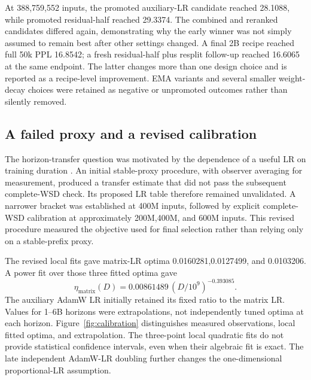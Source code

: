 At 388,759,552 inputs, the promoted auxiliary-LR candidate reached 28.1088, while promoted residual-half reached 29.3374. The combined and reranked candidates differed again, demonstrating why the early winner was not simply assumed to remain best after other settings changed. A final 2B recipe reached full 50k PPL 16.8542; a fresh residual-half plus resplit follow-up reached 16.6065 at the same endpoint. The latter changes more than one design choice and is reported as a recipe-level improvement. EMA variants and several smaller weight-decay choices were retained as negative or unpromoted outcomes rather than silently removed.

\subsection{A failed proxy and a revised calibration}

The horizon-transfer question was motivated by the dependence of a useful LR on training duration \citep{lrhorizon}. An initial stable-proxy procedure, with observer averaging for measurement, produced a transfer estimate that did not pass the subsequent complete-WSD check. Its proposed LR table therefore remained unvalidated. A narrower bracket was established at 400M inputs, followed by explicit complete-WSD calibration at approximately 200M,400M, and 600M inputs. This revised procedure measured the objective used for final selection rather than relying only on a stable-prefix proxy.

The revised local fits gave matrix-LR optima 0.0160281,0.0127499, and 0.0103206. A power fit over those three fitted optima gave
\begin{equation}
  \eta_{\mathrm{matrix}}(D)=0.00861489\,(D/10^9)^{-0.393085}.
  \label{eq:lr-law}
\end{equation}
The auxiliary AdamW LR initially retained its fixed ratio to the matrix LR. Values for 1--6B horizons were extrapolations, not independently tuned optima at each horizon. Figure~\ref{fig:calibration} distinguishes measured observations, local fitted optima, and extrapolation. The three-point local quadratic fits do not provide statistical confidence intervals, even when their algebraic fit is exact. The late independent AdamW-LR doubling further changes the one-dimensional proportional-LR assumption.


